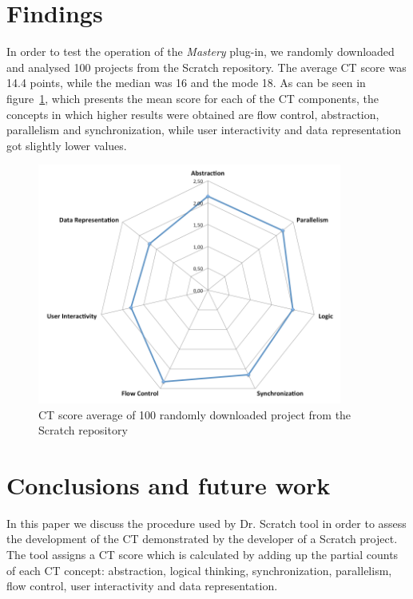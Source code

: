 \documentclass[a4paper,11pt]{article}
\begin{document}
\section{Findings}
\label{sec:findings}

In order to test the operation of the \textit{Mastery} plug-in, we randomly downloaded and analysed 100 projects from the Scratch repository. The average CT score was 14.4 points, while the median was 16 and the mode 18. As can be seen in figure~\ref{fig:scores}, which presents the mean score for each of the CT components, the concepts in which higher results were obtained are flow control, abstraction, parallelism and synchronization, while user interactivity and data representation got slightly lower values.
\begin{figure}
  \centering
    \includegraphics[width=10cm]{img/spider.png}
    \caption{CT score average of 100 randomly downloaded project from the Scratch repository}
    \label{fig:scores}
\end{figure}

\section{Conclusions and future work}
\label{sec:conclusions}
In this paper we discuss the procedure used by Dr. Scratch tool in order to assess the development of the CT demonstrated by the developer of a Scratch project. The tool assigns a CT score which is calculated by adding up the partial counts of each CT concept: abstraction, logical thinking, synchronization, parallelism, flow control, user interactivity and data representation.
\end{document}
